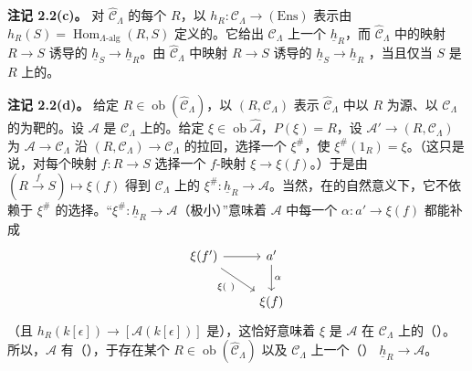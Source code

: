 \textbf{注记 2.2(c)。} 对 $\widehat{\mathcal C}_\Lambda$ 的每个 $R$，以 $h_R:\mathcal C_\Lambda\to(\mathrm{Ens})$ 表示由
$h_R(S)=\operatorname{Hom}_{\Lambda\text{-alg}}(R,S)$ 定义的。它给出 $\mathcal C_\Lambda$ 上一个 $\underline h_R$，而 $\widehat{\mathcal C}_\Lambda$ 中的映射 $R\to S$
诱导的 $\underline h_S\to\underline h_R$。由 $\widehat{\mathcal C}_\Lambda$ 中映射 $R\to S$ 诱导的 $\underline h_S\to\underline h_R$ ，当且仅当 $S$ 是 $R$ 上的。

\textbf{注记 2.2(d)。} 给定 $R\in\operatorname{ob}(\widehat{\mathcal C}_\Lambda)$，以 $(R,\mathcal C_\Lambda)$ 表示 $\widehat{\mathcal C}_\Lambda$ 中以 $R$ 为源、以 $\mathcal C_\Lambda$ 的为靶的。设 $\mathcal A$ 是 $\mathcal C_\Lambda$ 上的。给定 $\xi\in\operatorname{ob}\widehat{\mathcal A}$，$P(\xi)=R$，设 $\mathcal A'\to(R,\mathcal C_\Lambda)$ 为 $\mathcal A\to\mathcal C_\Lambda$ 沿 $(R,\mathcal C_\Lambda)\to\mathcal C_\Lambda$ 的拉回，选择一个 $\xi^\#$，使 $\xi^\#(1_R)=\xi$。（这只是说，对每个映射 $f:R\to S$ 选择一个 $f$-映射 $\xi\to\xi(f)$。）于是由 $(R\xrightarrow f S)\mapsto\xi(f)$ 得到 $\mathcal C_\Lambda$ 上的 $\xi^\#:\underline h_R\to\mathcal A$。当然，在的自然意义下，它不依赖于 $\xi^\#$ 的选择。“$\xi^\#:\underline h_R\to\mathcal A$（极小）”意味着 $\mathcal A$ 中每一个 $\alpha:a'\to\xi(f)$ 都能补成
\[
\begin{tikzcd}
\xi(f')\arrow[r]\arrow[dr,"\xi(\ )"']&a'\arrow[d,"\alpha"]\\
&\xi(f)
\end{tikzcd}
\]
（且 $h_R(k[\epsilon])\to[\mathcal A(k[\epsilon])]$ 是），这恰好意味着 $\xi$ 是 $\mathcal A$ 在 $\mathcal C_\Lambda$ 上的（）。所以，$\mathcal A$ 有（），于存在某个 $R\in\operatorname{ob}(\widehat{\mathcal C}_\Lambda)$ 以及 $\mathcal C_\Lambda$ 上一个（） $\underline h_R\to\mathcal A$。

